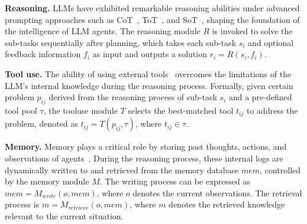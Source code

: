 \textbf{Reasoning.}
LLMs have exhibited remarkable reasoning abilities under advanced prompting approaches such as CoT~\citep{wei2022chain}, ToT~\citep{yao2024tree}, and SoT~\citep{shang2024defint}, shaping the foundation of the intelligence of LLM agents.
The reasoning module $R$ is invoked to solve the sub-tasks sequentially after planning, which takes each sub-task $s_i$ and optional feedback information $f_i$ as input and outputs a solution $r_i=R(s_i,f_i)$.

\textbf{Tool use.}
The ability of using external tools~\citep{shen2024hugginggpt,schick2024toolformer} overcomes the limitations of the LLM’s internal knowledge during the reasoning process. 
Formally, given certain problem $p_{ij}$ derived from the reasoning process of sub-task $s_i$ and a pre-defined tool pool $\tau$, the tooluse module $T$ selects the best-matched tool $t_{ij}$ to address the problem, denoted as $t_{ij} = T(p_{ij}, \tau)$, where $t_{ij} \in \tau$. 

\textbf{Memory.}
Memory plays a critical role by storing past thoughts, actions, and observations of agents~\citep{park2023generative,shinn2024reflexion}.
During the reasoning process, these internal logs are dynamically written to and retrieved from the memory database $mem$, controlled by the memory module $M$.
The writing process can be expressed as $mem = M_{write}(o, mem)$, where $o$ denotes the current observations. The retrieval process is $m = M_{retrieve}(o, mem)$, where $m$ denotes the retrieved knowledge relevant to the current situation.


